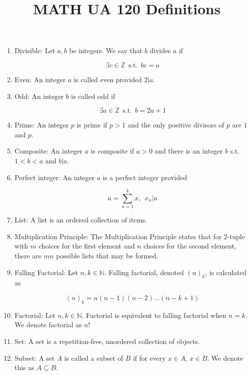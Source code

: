 \documentclass{article}
\title{MATH UA 120 Definitions}
\date{}
\begin{document}
\maketitle

\begin{enumerate}
    \item Divisible: Let $a,b$ be integers.
    We say that $b$ divides $a$ if

    \[\exists c\in\mathbb{Z}\:\: \text{s.t.} \:\: bc=a\]

    \item Even: An integer $a$ is called even provided $2|a$.

    \item Odd: An integer $b$ is called odd if

    \[\exists a\in\mathbb{Z} \:\: \text{s.t.} \:\: b=2a+1\]

    \item Prime: An integer $p$ is prime if $p>1$ and the only positive divisors of $p$ are $1$ and $p$.

    \item Composite: An integer $a$ is composite if $a>0$ and there is an integer $b$ s.t. $1<b<a$ and $b|a$.

    \item Perfect integer: An integer $a$ is a perfect integer provided

    \[a=\sum_{n=1}^k x,\:\: x_n|a\]

    \item List: A list is an ordered collection of items.

    \item Multiplication Principle: The Multiplication Principle states that for 2-tuple with $m$ choices for the first element and $n$ choices for the second element, there are $mn$ possible lists that may be formed.

    \item Falling Factorial: Let $n,k\in\mathbb{N}$.
    Falling factorial, denoted $(n)_k$, is calculated as

    \[(n)_k=n(n-1)(n-2)\dots(n-k+1)\]

    \item Factorial: Let $n,k\in\mathbb{N}$.
    Factorial is equivalent to falling factorial when $n=k$.
    We denote factorial as $n!$

    \item Set: A set is a repetition-free, unordered collection of objects.

    \item Subset: A set $A$ is called a subset of $B$ if for every $x\in A$, $x\in B$.
    We denote this as $A\subseteq B$.


\end{enumerate}
\end{document}
